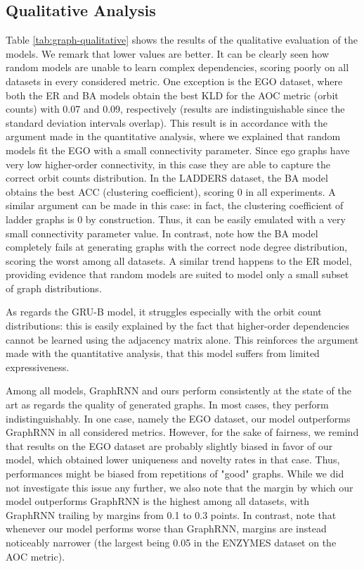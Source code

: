 \subsection{Qualitative Analysis}
Table \ref{tab:graph-qualitative} shows the results of the qualitative evaluation of the models. We remark that lower values are better.
It can be clearly seen how random models are unable to learn complex dependencies, scoring poorly on all datasets in every considered metric. One exception is the EGO dataset, where both the ER and BA models obtain the best KLD for the AOC metric (orbit counts) with 0.07 and 0.09, respectively (results are indistinguishable since the standard deviation intervals overlap). This result is in accordance with the argument made in the quantitative analysis, where we explained that random models fit the EGO with a small connectivity parameter. Since ego graphs have very low higher-order connectivity, in this case they are able to capture the correct orbit counts distribution. In the LADDERS dataset, the BA model obtains the best ACC (clustering coefficient), scoring $0$ in all experiments. A similar argument can be made in this case: in fact, the clustering coefficient of ladder graphs is 0 by construction. Thus, it can be easily emulated with a very small connectivity parameter value. In contrast, note how the BA model completely fails at generating graphs with the correct node degree distribution, scoring the worst among all datasets. A similar trend happens to the ER model, providing evidence that random models are suited to model only a small subset of graph distributions.

As regards the GRU-B model, it struggles especially with the orbit count distributions: this is easily explained by the fact that higher-order dependencies cannot be learned using the adjacency matrix alone. This reinforces the argument made with the quantitative analysis, \ie that this model suffers from limited expressiveness.

Among all models, GraphRNN and ours perform consistently at the state of the art as regards the quality of generated graphs. In most cases, they perform indistinguishably. In one case, namely the EGO dataset, our model outperforms GraphRNN in all considered metrics. However, for the sake of fairness, we remind that results on the EGO dataset are probably slightly biased in favor of our model, which obtained lower uniqueness and novelty rates in that case. Thus, performances might be biased from repetitions of "good" graphs. While we did not investigate this issue any further, we also note that the margin by which our model outperforms GraphRNN is the highest among all datasets, with GraphRNN trailing by margins from 0.1 to 0.3 points. In contrast, note that whenever our model performs worse than GraphRNN, margins are instead noticeably narrower (the largest being 0.05 in the ENZYMES dataset on the AOC metric).

